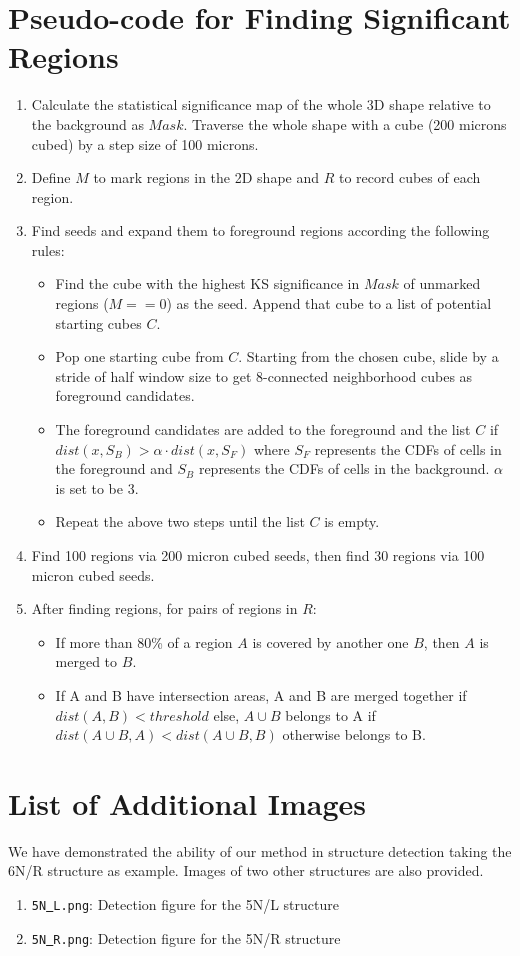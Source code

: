 \documentclass[runningheads]{llncs}
\begin{document}
\section{Pseudo-code for Finding Significant Regions}
\begin{enumerate}
  \item Calculate the statistical significance map of the whole 3D shape relative to the background as $Mask$. Traverse the whole shape with a cube (200 microns cubed) by a step size of 100 microns.
  \item Define $M$ to mark regions in the 2D shape and $R$ to record cubes of each region.
  \item Find seeds and expand them to foreground regions according the following rules:
  		\begin{itemize}
			 \item Find the cube with the highest KS significance in $Mask$ of unmarked regions ($M==0$) as the seed. Append that cube to a list of potential starting cubes $C$.
			 \item Pop one starting cube from $C$. Starting from the chosen cube, slide by a stride of half window size to get 8-connected neighborhood cubes as foreground candidates.
 			 \item The foreground candidates are added to the foreground and the list $C$ if $dist(x,S_B )>\alpha \cdot dist(x,S_F)$ where $S_F$ represents the CDFs of cells in the foreground and $S_B$ represents the CDFs of cells in the background. $\alpha$ is set to be 3.
			 \item Repeat the above two steps until the list $C$ is empty.
		\end{itemize}
  \item Find 100 regions via 200 micron cubed seeds, then find 30 regions via 100 micron cubed seeds.
  \item After finding regions, for pairs of regions in $R$:
 		 \begin{itemize}
			 \item If more than 80\% of a region $A$ is covered by another one $B$, then $A$ is merged to $B$.
			 \item If A and B have intersection areas, A and B are merged together if $dist(A,B)<threshold $ else, $A\cup B$ belongs to A if $dist(A\cup B,A)<dist(A\cup B,B)$ otherwise belongs to B.
		\end{itemize}
\end{enumerate}

\section{List of Additional Images}
We have demonstrated the ability of our method in structure detection taking the 6N/R structure as example. Images of two other structures are also provided.
\begin{enumerate}
\item \texttt{5N\underline{{ }}L.png}: Detection figure for the 5N/L structure
\item \texttt{5N\underline{{ }}R.png}: Detection figure for the 5N/R structure
\end{enumerate}
\end{document}
